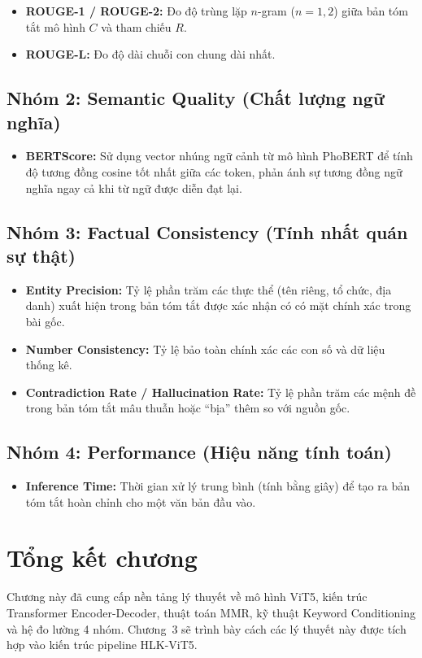 \begin{itemize}
  \item \textbf{ROUGE-1 / ROUGE-2:} Đo độ trùng lặp $n$-gram ($n=1, 2$) giữa bản tóm tắt mô hình $C$ và tham chiếu $R$.
  \item \textbf{ROUGE-L:} Đo độ dài chuỗi con chung dài nhất.
\end{itemize}

\subsection{Nhóm 2: Semantic Quality (Chất lượng ngữ nghĩa)}

\begin{itemize}
  \item \textbf{BERTScore:} Sử dụng vector nhúng ngữ cảnh từ mô hình PhoBERT \cite{Nguyen2020} để tính độ tương đồng cosine tốt nhất giữa các token, phản ánh sự tương đồng ngữ nghĩa ngay cả khi từ ngữ được diễn đạt lại.
\end{itemize}

\subsection{Nhóm 3: Factual Consistency (Tính nhất quán sự thật)}

\begin{itemize}
  \item \textbf{Entity Precision:} Tỷ lệ phần trăm các thực thể (tên riêng, tổ chức, địa danh) xuất hiện trong bản tóm tắt được xác nhận có có mặt chính xác trong bài gốc.
  \item \textbf{Number Consistency:} Tỷ lệ bảo toàn chính xác các con số và dữ liệu thống kê.
  \item \textbf{Contradiction Rate / Hallucination Rate:} Tỷ lệ phần trăm các mệnh đề trong bản tóm tắt mâu thuẫn hoặc ``bịa'' thêm so với nguồn gốc.
\end{itemize}

\subsection{Nhóm 4: Performance (Hiệu năng tính toán)}

\begin{itemize}
  \item \textbf{Inference Time:} Thời gian xử lý trung bình (tính bằng giây) để tạo ra bản tóm tắt hoàn chỉnh cho một văn bản đầu vào.
\end{itemize}

\section{Tổng kết chương}

Chương này đã cung cấp nền tảng lý thuyết về mô hình ViT5, kiến trúc Transformer Encoder-Decoder, thuật toán MMR, kỹ thuật Keyword Conditioning và hệ đo lường 4 nhóm. Chương~3 sẽ trình bày cách các lý thuyết này được tích hợp vào kiến trúc pipeline HLK-ViT5.
